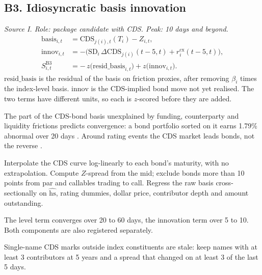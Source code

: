 \documentclass[11pt,letterpaper]{article}
\newcommand{\hs}{\mathrm{hs}}             %
\newcommand{\SD}{\mathrm{SD}}             %
\newcommand{\rcx}{r^{\mathrm{cx}}}        %
\begin{document}
\subsection{B3. Idiosyncratic basis innovation}
\emph{Source I. Role: package candidate with CDS. Peak: 10 days and beyond.}
\begin{align}
\mathrm{basis}_{i,t}&=\mathrm{CDS}_{j(i),t}(T_i)-Z_{i,t},\\
\mathrm{innov}_{i,t}&=-\bigl(\SD_i\,\Delta\mathrm{CDS}_{j(i)}(t-5,t)+\rcx_i(t-5,t)\bigr),\\
S^{\mathrm{B3}}_{i,t}&=-\,z\bigl(\mathrm{resid\_basis}_{i,t}\bigr)+z\bigl(\mathrm{innov}_{i,t}\bigr).
\end{align}
$\mathrm{resid\_basis}$ is the residual of the basis on friction proxies, after removing $\beta_i$ times the index-level basis. $\mathrm{innov}$ is the CDS-implied bond move not yet realised. The two terms have different units, so each is $z$-scored before they are added.
\begin{spec}
\item[Mechanism and evidence.] The part of the CDS-bond basis unexplained by funding, counterparty and liquidity frictions predicts convergence: a bond portfolio sorted on it earns 1.79\% abnormal over 20 days \cite{klz2016}. Around rating events the CDS market leads bonds, not the reverse \cite{lnv2018}.
\item[Build.] Interpolate the CDS curve log-linearly to each bond's maturity, with no extrapolation. Compute $Z$-spread from the mid; exclude bonds more than 10 points from par and callables trading to call. Regress the raw basis cross-sectionally on $\widehat{\hs}$, rating dummies, dollar price, contributor depth and amount outstanding.
\item[Horizon.] The level term converges over 20 to 60 days, the innovation term over 5 to 10. Both components are also registered separately.
\item[Decay and pitfalls.] Single-name CDS marks outside index constituents are stale: keep names with at least 3 contributors at 5 years and a spread that changed on at least 3 of the last 5 days.
\end{spec}
\end{document}
